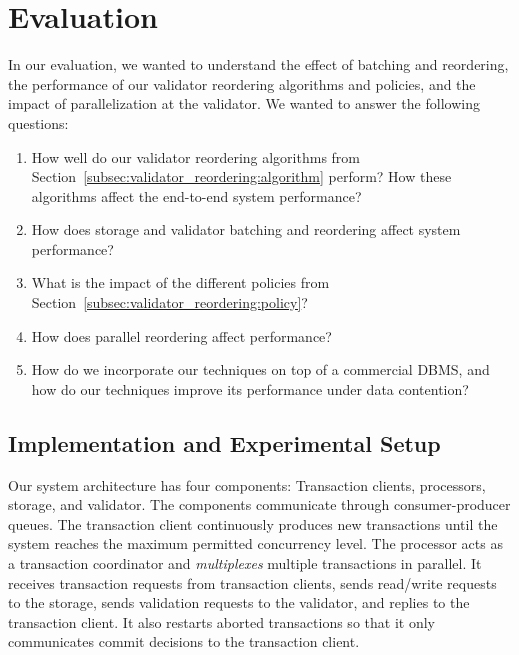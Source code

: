 \section{Evaluation}\label{sec:experiments}

In our evaluation, we wanted to understand the effect of batching and reordering, the performance of our validator reordering algorithms and policies, and the impact of parallelization at the validator.
We wanted to answer the following questions:
\begin{enumerate}[leftmargin=*]
\item How well do our validator reordering algorithms from Section~\ref{subsec:validator_reordering:algorithm} perform? How  these algorithms affect the end-to-end system performance?
\vspace{-0.5em}
\item How does storage and validator batching and reordering
  affect system performance?
\vspace{-0.5em}
\item What is the impact of the different policies from Section~\ref{subsec:validator_reordering:policy}?
\vspace{-0.5em}
\item How does parallel reordering affect performance?
\vspace{-0.5em}
\item How do we incorporate our techniques on top of a commercial DBMS, and how do our techniques improve its performance under data contention?
\end{enumerate}

\subsection{Implementation and Experimental Setup}
\label{subsec:experiment:implementation}


Our system architecture has four components: Transaction clients, processors, storage, and validator. The components communicate through consumer-producer queues. 
The transaction client continuously produces new transactions until the system reaches the maximum permitted concurrency level. The processor acts as a transaction coordinator and \emph{multiplexes} multiple transactions in parallel. It receives transaction requests from transaction clients, sends read/write requests to the storage, sends validation requests to the validator, and replies to the transaction client. It also restarts aborted transactions so that it only communicates commit decisions to the transaction client.

